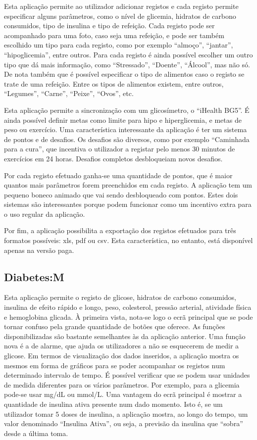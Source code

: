 Esta aplicação permite ao utilizador adicionar registos e cada registo permite especificar alguns parâmetros, como o nível de glicemia, hidratos de carbono consumidos, tipo de insulina e tipo de refeição. Cada registo pode ser acompanhado para uma foto, caso seja uma refeição, e pode ser também escolhido um tipo para cada registo, como por exemplo ``almoço'', ``jantar'', ``hipoglicemia'', entre outros. Para cada registo é ainda possível escolher um outro tipo que dá mais informação, como ``Stressado'', ``Doente'', ``Álcool'', mas não só. De nota também que é possível especificar o tipo de alimentos caso o registo se trate de uma refeição. Entre os tipos de alimentos existem, entre outros, ``Legumes'', ``Carne'', ``Peixe'', ``Ovos'', etc.

Esta aplicação permite a sincronização com um glicosímetro, o ``iHealth BG5''. É ainda possível definir metas como limite para hipo e hiperglicemia, e metas de peso ou exercício. Uma característica interessante da aplicação é ter um sistema de pontos e de desafios. Os desafios são diversos, como por exemplo ``Caminhada para a cura'', que incentiva o utilizador a registar pelo menos 30 minutos de exercícios em 24 horas. Desafios completos desbloqueiam novos desafios. 

Por cada registo efetuado ganha-se uma quantidade de pontos, que é maior quantos mais parâmetros forem preenchidos em cada registo. A aplicação tem um pequeno boneco animado que vai sendo desbloqueado com pontos. Estes dois sistemas são interessantes porque podem funcionar como um incentivo extra para o uso regular da aplicação. 

Por fim, a aplicação possibilita a exportação dos registos efetuados para três formatos possíveis: xls, pdf ou csv. Esta característica, no entanto, está disponível apenas na versão paga.

\subsection{Diabetes:M}

Esta aplicação permite o registo de glicose, hidratos de carbono consumidos, insulina de efeito rápido e longo, peso, colesterol, pressão arterial, atividade física e hemoglobina glicada. À primeira vista, nota-se logo o ecrã principal que se pode tornar confuso pela grande quantidade de botões que oferece. As funções disponibilizadas são bastante semelhantes às da aplicação anterior. Uma função nova é a de alarme, que ajuda os utilizadores a não se esquecerem de medir a glicose. Em termos de visualização dos dados inseridos, a aplicação mostra os mesmos em forma de gráficos para se poder acompanhar os registos num determinado intervalo de tempo. É possível verificar que se podem usar unidades de medida diferentes para os vários parâmetros. Por exemplo, para a glicemia pode-se usar mg/dL ou mmol/L. Uma vantagem do ecrã principal é mostrar a quantidade de insulina ativa presente num dado momento. Isto é, se um utilizador tomar 5 doses de insulina, a aplicação mostra, ao longo do tempo, um valor denominado ``Insulina Ativa'', ou seja, a previsão da insulina que ``sobra'' desde a última toma.

